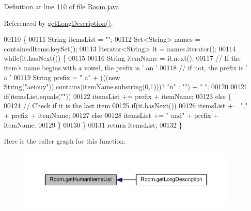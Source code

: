 Definition at line \hyperlink{Room_8java_source_l00110}{110} of file \hyperlink{Room_8java_source}{Room.\-java}.



Referenced by \hyperlink{Room_8java_source_l00100}{get\-Long\-Description()}.


\begin{DoxyCode}
00110                                       \{
00111         String itemsList = \textcolor{stringliteral}{""};
00112         Set<String> names = containedItems.keySet();
00113         Iterator<String> it = names.iterator();
00114         \textcolor{keywordflow}{while}(it.hasNext()) \{
00115 
00116             String itemName = it.next();
00117             \textcolor{comment}{// If the item's name begins with a vowel, the prefix is ' an '}
00118             \textcolor{comment}{// if not, the prefix is ' a '}
00119             String prefix = \textcolor{stringliteral}{" a"} + (((\textcolor{keyword}{new} String(\textcolor{stringliteral}{"aeiouy"})).contains(itemName.substring(0,1)))? \textcolor{stringliteral}{"n"} : \textcolor{stringliteral}{""}) +
       \textcolor{stringliteral}{" "};
00120 
00121             \textcolor{keywordflow}{if}(itemsList.equals(\textcolor{stringliteral}{""}))
00122                 itemsList += prefix + itemName;
00123             \textcolor{keywordflow}{else} \{
00124                 \textcolor{comment}{// Check if it is the last item}
00125                 \textcolor{keywordflow}{if}(it.hasNext())
00126                     itemsList += \textcolor{stringliteral}{","} + prefix + itemName;
00127                 \textcolor{keywordflow}{else}
00128                     itemsList += \textcolor{stringliteral}{" and"} + prefix + itemName;
00129             \}
00130         \}
00131         \textcolor{keywordflow}{return} itemsList;
00132     \}
\end{DoxyCode}


Here is the caller graph for this function\-:
\nopagebreak
\begin{figure}[H]
\begin{center}
\leavevmode
\includegraphics[width=350pt]{classRoom_ab8a87ad306f77a936873094b479bcde8_icgraph}
\end{center}
\end{figure}


